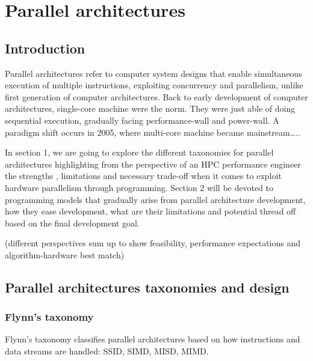 \chapter{Parallel architectures}



\section{Introduction}

Parallel architectures refer to computer system designs that enable simultaneous execution of multiple instructions, exploiting
concurrency and parallelism, unlike first generation of computer architectures.  Back to early development of computer architectures, single-core machine were the norm. They were just able of doing sequential execution, gradually facing performance-wall and power-wall. A paradigm shift occurs in 2005, where multi-core machine became mainstream…..

In section 1, we are going to explore the different taxonomies for parallel architectures highlighting from the perspective of an HPC performance engineer the strengths , limitations and necessary trade-off when it comes to exploit hardware parallelism through programming. Section 2 will be devoted to programming models that gradually arise from parallel architecture development, how they ease development, what are their limitations and potential thread off based on the final development goal.


(different perspectives sum up to show feasibility, performance expectations and algorithm-hardware best match)

\section{Parallel architectures taxonomies and design}

\subsection{Flynn's taxonomy}

Flynn's taxonomy classifies parallel architectures based on how instructions and data streams are handled: SSID, SIMD, MISD, MIMD. 


